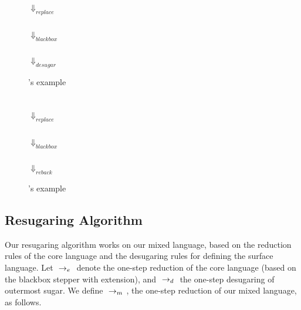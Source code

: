 \begin{center}
\begin{figure}[h]
\centering
{}\\ $\Downarrow_{replace}$\\ \\ $\Downarrow_{blackbox}$\\ \\ $\Downarrow_{desugar}$\\ 
\caption{'s example}
\label{fig:e1}
\end{figure}

\begin{figure}[h]
\centering
{}\\ $\Downarrow_{replace}$ \\\\ $\Downarrow_{blackbox}$\\  \\ $\Downarrow_{reback}$\\ 
\caption{'s example}
\label{fig:e2}
\end{figure}



\end{center}

\subsection{Resugaring Algorithm}

Our resugaring algorithm works on our mixed language, based on the reduction rules of the core language and the desugaring rules for defining the surface language. Let $~\rightarrow_e~$ denote the one-step reduction of the core language (based on the blackbox stepper with extension), and $~\rightarrow_d~$ the one-step desugaring of outermost sugar. We define $~\rightarrow_m~$, the one-step reduction of our mixed language, as follows.

\label{mark:miexedreduction}
{}

